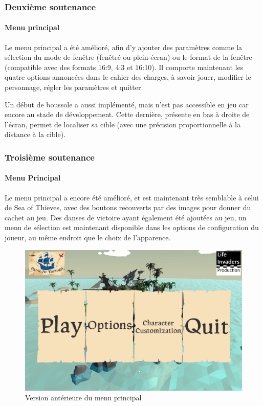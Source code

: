     \subsubsection{Deuxième soutenance}
    
        \paragraph{Menu principal}
        
        Le menu principal a été amélioré, afin d'y ajouter des paramètres comme la sélection du mode de fenêtre (fenêtré 
        ou plein-écran) ou le format de la fenêtre (compatible avec des formats 16:9, 4:3 et 16:10).
        Il comporte maintenant les quatre options annoncées dans le cahier des charges, à savoir jouer, modifier le personnage, 
        régler les paramètres et quitter.

        Un début de boussole a aussi implémenté, mais n'est pas accessible en jeu car encore au stade de développement. Cette dernière, 
        présente en bas à droite de l'écran, permet de localiser sa cible (avec une précision proportionnelle à la distance à la cible).

    \subsubsection{Troisième soutenance}
    
        \paragraph{Menu Principal}
        
        Le menu principal a encore été amélioré, et est maintenant très semblable à celui de Sea of Thieves, avec des boutons recouverts 
        par des images pour donner du cachet au jeu. Des danses de victoire ayant également été ajoutées au jeu, un menu de sélection est maintenant 
        disponible dans les options de configuration du joueur, au même endroit que le choix de l'apparence.
    
        \begin{figure}[hbt!]
            \centering
            \includegraphics[scale=0.4]{img/mainmenu.png}
            \caption{Version antérieure du menu principal}
        \end{figure}

